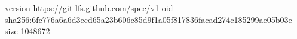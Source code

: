 version https://git-lfs.github.com/spec/v1
oid sha256:6fc776a6a6d3ecd65a23b606c85d9f1a05f817836facad274c185299ae05b03e
size 1048672
